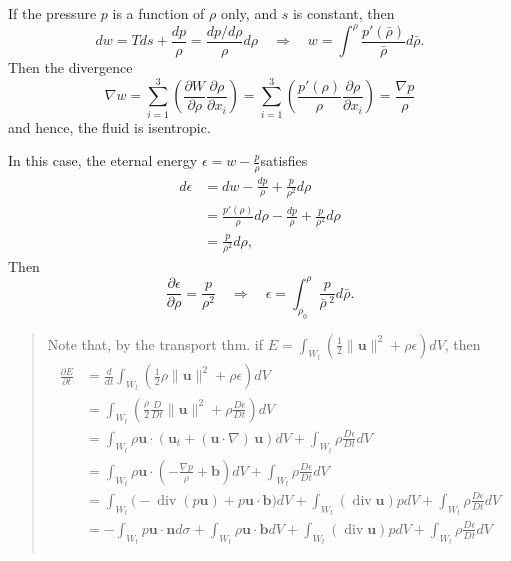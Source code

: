 If the pressure $p$ is a function of $\rho$ only, and $s$ is constant, then
\begin{equation}
dw = Tds + \frac{dp}{\rho} =\frac{dp/d\rho}{\rho}d\rho
\quad \Rightarrow\quad
w = \int^{\rho} \frac{p'(\bar{\rho})}{\bar{\rho}}d\bar{\rho}.
\end{equation}
Then the divergence
\begin{equation}
\nabla w
= \sum_{i=1}^{3}\left(\frac{\partial W}{\partial \rho}\frac{\partial \rho}{\partial x_i}\right)
= \sum_{i=1}^{3}\left(\frac{p'(\rho)}{\rho}\frac{\partial \rho}{\partial x_i}\right) = \frac{\nabla p}{\rho}
\end{equation}
and hence, the fluid is isentropic.

In this case, the eternal energy $\displaystyle \epsilon = w-\frac{p}{\rho}$​ satisfies
\begin{equation}
\begin{aligned}
d\epsilon
&= dw - \frac{dp}{\rho} + \frac{p}{\rho^2} d\rho\\
&= \frac{p'(\rho)}{\rho} d\rho - \frac{dp}{\rho} + \frac{p}{\rho^2} d\rho\\
&= \frac{p}{\rho^2} d\rho,
\end{aligned}
\end{equation}
Then
\begin{equation}
\frac{\partial \epsilon}{\partial \rho} = \frac{p}{\rho^2}\quad\Rightarrow\quad \epsilon = \int^{\rho}_{\rho_0}\frac{p}{\bar{\rho}\,^2}d\bar{\rho}.
\end{equation}


\begin{quote}
	Note that, by the transport thm. if $\displaystyle E=\int_{W_t}\left(\frac{1}{2}\lVert\textbf{u}\rVert^2 + \rho\epsilon\right)dV$, then
\begin{equation}
\begin{aligned}
\frac{\partial E}{\partial t}
&=\frac{d}{dt}\int_{W_t}\left(\frac{1}{2}\rho\lVert\textbf{u}\rVert^2 + \rho\epsilon\right)dV \\
&=\int_{W_t}\left(\frac{\rho}{2}\frac{D}{Dt}\lVert\textbf{u}\rVert^2+\rho\frac{D\epsilon}{Dt}\right)dV\\
&= \int_{W_t}\rho\textbf{u}\cdot \left(\textbf{u}_t + (\textbf{u}\cdot\nabla)\,\textbf{u}\right) dV
+ \int_{W_t} \rho \frac{D\epsilon}{Dt} dV\\
&= \int_{W_t}\rho\textbf{u}\cdot \left(-\frac{\nabla p}{\rho} + \textbf{b}\right) dV
+ \int_{W_t} \rho \frac{D\epsilon}{Dt} dV\\
&= \int_{W_t} \big(-\operatorname{div}(p\textbf{u}) + p\textbf{u}\cdot\textbf{b}\big)dV
+ \int_{W_t} (\operatorname{div}\textbf{u})pdV
+ \int_{W_t} \rho\frac{D\epsilon}{Dt}dV\\
&= -\int_{W_t} p\textbf{u}\cdot\textbf{n}d\sigma
+ \int_{W_t}\rho\textbf{u}\cdot\textbf{b}dV
+ \int_{W_t} (\operatorname{div}\textbf{u})pdV
+ \int_{W_t} \rho\frac{D\epsilon}{Dt}dV\\
\end{aligned}
\end{equation}

\end{quote}

